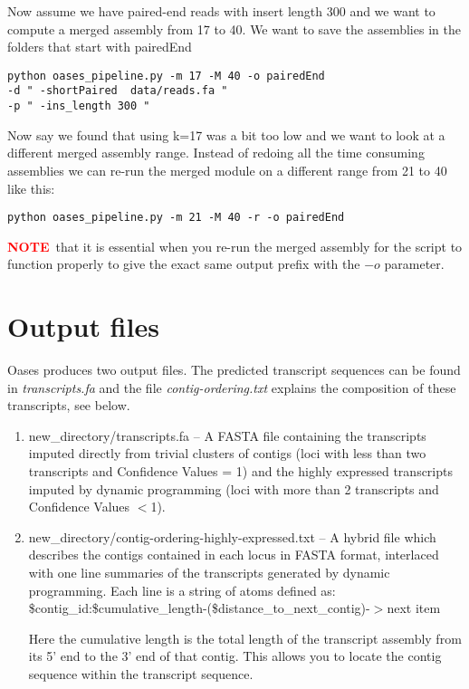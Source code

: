 \documentclass[12pt]{article}
\newcommand{\NOTE}{\textcolor{red}{\textbf{NOTE}}}
\begin{document}
Now assume we have paired-end reads with insert length 300 and we want to compute a merged assembly from 17 to 40. We want to save the assemblies in the folders that start with pairedEnd
\begin{verbatim}
python oases_pipeline.py -m 17 -M 40 -o pairedEnd 
-d " -shortPaired  data/reads.fa "
-p " -ins_length 300 "
\end{verbatim}
Now say we found that using k=17 was a bit too low and we want to look at a different merged assembly range. Instead of redoing all the time consuming assemblies we can re-run the merged module on a different range from 21 to 40 like this:
\begin{verbatim}
python oases_pipeline.py -m 21 -M 40 -r -o pairedEnd  
\end{verbatim}
\NOTE \  that it is essential when you re-run the merged assembly for the script to function properly to give the exact same output prefix with the $-o$ parameter.
\section{Output files}

Oases produces two output files. The predicted transcript sequences can be found in \emph{transcripts.fa} and the file \emph{contig-ordering.txt} explains the composition of these transcripts, see below.
\begin{enumerate}
\item new\_directory/transcripts.fa --
	A FASTA file containing the transcripts imputed directly from trivial
	clusters of contigs (loci with less than two transcripts and Confidence Values = 1)
	and the highly expressed transcripts imputed by dynamic
	programming (loci with more than 2 transcripts and Confidence Values $<$1).
   
\item 
new\_directory/contig-ordering-highly-expressed.txt --
	A hybrid file which describes the contigs contained in each locus in FASTA
	format, interlaced with one line summaries of the transcripts generated by 
	dynamic programming. Each line is a string of atoms defined as:
	\$contig\_id:\$cumulative\_length-(\$distance\_to\_next\_contig)-$>$next item

	Here the cumulative length is the total length of the transcript assembly from
	its 5' end to the 3' end of that contig. This allows you to locate the contig
	sequence within the transcript sequence.
	
\end{enumerate}	
\end{document}
